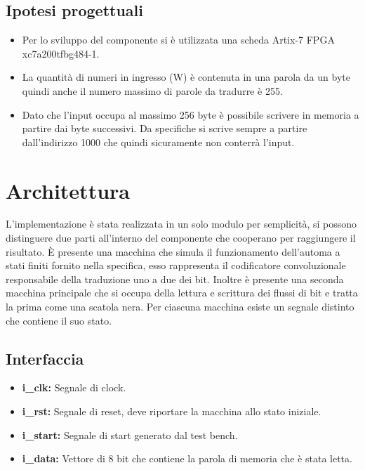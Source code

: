 \documentclass{article}
\begin{document}
\subsection{Ipotesi progettuali}
\begin{itemize}
\item {Per lo sviluppo del componente si è utilizzata una scheda Artix-7 FPGA xc7a200tfbg484-1.}
\item {La quantità di numeri in ingresso (W) è contenuta in una parola da un byte quindi anche il numero massimo di parole da tradurre è 255.}
\item {Dato che l'input occupa al massimo 256 byte è possibile scrivere in memoria a partire dai byte successivi. Da specifiche si scrive sempre a partire dall'indirizzo 1000 che quindi sicuramente non conterrà l'input.}
\end{itemize}

\pagebreak


\section{Architettura}
L'implementazione è stata realizzata in un solo modulo per semplicità, si possono distinguere due parti all'interno del componente che cooperano per raggiungere il risultato. È presente una macchina che simula il funzionamento dell'automa a stati finiti fornito nella specifica, esso rappresenta il codificatore convoluzionale responsabile della traduzione uno a due dei bit. Inoltre è presente una seconda macchina principale che si occupa della lettura e scrittura dei flussi di bit e tratta la prima come una scatola nera. Per ciascuna macchina esiste un segnale distinto che contiene il suo stato.

\subsection{Interfaccia}
\begin{itemize}
	\item \textbf{i\_clk:} Segnale di clock.
	\item \textbf{i\_rst:} Segnale di reset, deve riportare la macchina allo stato iniziale.
	\item \textbf{i\_start:} Segnale di start generato dal test bench.
	\item \textbf{i\_data:} Vettore di 8 bit che contiene la parola di memoria che è stata letta.
\end{itemize}
\end{document}
